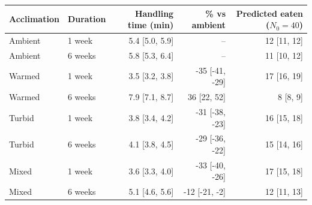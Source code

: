 \begin{tabular}{llrrr}
\toprule
Acclimation & Duration & Handling time (min) & \% vs ambient & Predicted eaten ($N_0{=}40$) \\
\midrule
Ambient & 1 week & 5.4 [5.0, 5.9] & -- & 12 [11, 12] \\
Ambient & 6 weeks & 5.8 [5.3, 6.4] & -- & 11 [10, 12] \\
Warmed & 1 week & 3.5 [3.2, 3.8] & -35 [-41, -29] & 17 [16, 19] \\
Warmed & 6 weeks & 7.9 [7.1, 8.7] & 36 [22, 52] & 8 [8, 9] \\
Turbid & 1 week & 3.8 [3.4, 4.2] & -31 [-38, -23] & 16 [15, 18] \\
Turbid & 6 weeks & 4.1 [3.8, 4.5] & -29 [-36, -22] & 15 [14, 16] \\
Mixed & 1 week & 3.6 [3.3, 4.0] & -33 [-40, -26] & 17 [15, 18] \\
Mixed & 6 weeks & 5.1 [4.6, 5.6] & -12 [-21, -2] & 12 [11, 13] \\
\bottomrule
\end{tabular}

